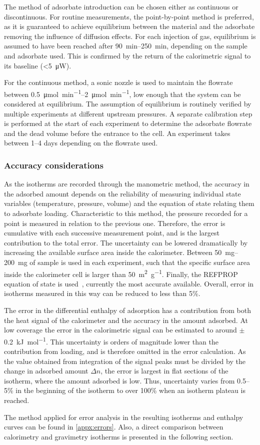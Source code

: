 The method of adsorbate introduction can be chosen either as
continuous or discontinuous. For routine measurements,
the point-by-point method is preferred, as it is guaranteed
to achieve equilibrium between the material and the adsorbate
removing the influence of diffusion effects.
For each injection of gas, equilibrium is assumed to have
been reached after \SIrange{90}{250}{\minute}, depending on the
sample and adsorbate used. This is confirmed by the return
of the calorimetric signal to its baseline (<\SI{5}{\micro\watt}).

For the continuous method, a sonic nozzle is used to 
maintain the flowrate between \SIrange{0.5}{2}{\micro\mol\per\minute},
low enough that the system can be considered at equilibrium.
The assumption of equilibrium is routinely verified by multiple
experiments at different upstream pressures.
A separate calibration step is performed at the start of each
experiment to determine the adsorbate flowrate and the dead volume
before the entrance to the cell. An experiment takes between 1--4 
days depending on the flowrate used. 

\subsubsection{Accuracy considerations}\label{calo:ltc}

As the isotherms are recorded through the manometric method,
the accuracy in the adsorbed amount depends on the reliability
of measuring individual state variables (temperature,
pressure, volume) and the equation of state relating them 
to adsorbate loading.
Characteristic to this method, the pressure recorded for 
a point is measured in relation to the previous one. Therefore,
the error is cumulative with each successive measurement point,
and is the largest contribution to the total error. The 
uncertainty can be lowered dramatically by increasing 
the available surface area inside the calorimeter.
Between \SIrange{50}{200}{\milli\gram}
of sample is used in each experiment, such that the specific
surface area inside the calorimeter cell is larger than
\SI{50}{\metre^2\per\gram}. Finally, the REFPROP equation
of state is used~\cite{lemmonNISTReferenceFluid1989}, 
currently the most accurate available.
Overall, error in isotherms measured in this way can be 
reduced to less than 5\%.

The error in the differential enthalpy of adsorption has a
contribution from both the heat signal of the calorimeter 
and the accuracy in the amount adsorbed.
At low coverage the error in the calorimetric signal can be
estimated to around \( \pm \) \SI{0.2} {\kilo\joule\per\mol}.
This uncertainty is orders of magnitude lower than the contribution
from loading, and is therefore omitted in the error calculation.
As the value obtained from integration of the signal peaks
must be divided by the change in adsorbed amount \(\Delta n\),
the error is largest in flat sections of the isotherm, where 
the amount adsorbed is low. Thus, uncertainty varies from 
0.5--5\% in the beginning of the isotherm to over 100\% when
an isotherm plateau is reached.

The method applied for error analysis in the resulting isotherms and
enthalpy curves can be found in \autoref{appx:errors}. 
Also, a direct comparison
between calorimetry and gravimetry isotherms is presented in the 
following section.